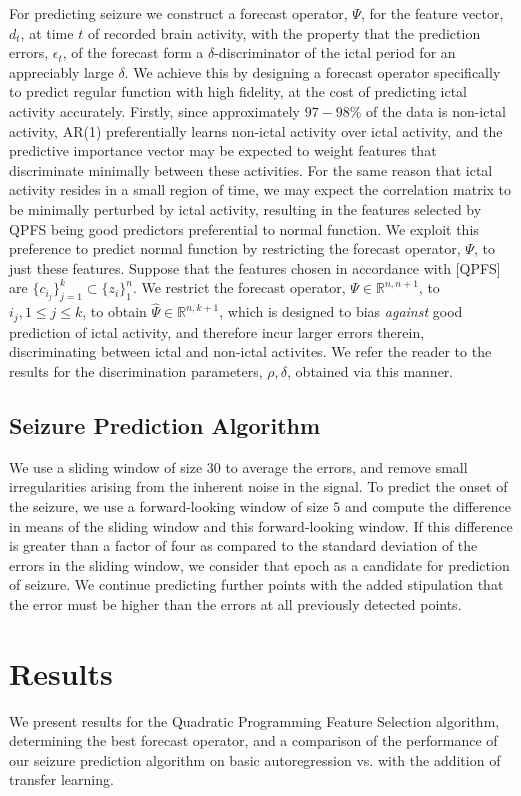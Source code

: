 \documentclass{article} %
\theoremstyle{definition}
\theoremstyle{remark}
\newcommand{\rls}[1]{\mathbb{R}^{#1}}
\newcommand{\e}{\epsilon}
\renewcommand{\e}{\epsilon}
\begin{document}
For predicting seizure we construct a forecast operator, $\Psi$, for the feature vector, $d_t$, at time $t$ of recorded brain activity, with the property that the prediction errors, $\e_t$, of the forecast form a $\delta$-discriminator of the ictal period for an appreciably large $\delta$. We achieve this by designing a forecast operator specifically to predict regular function with high fidelity, at the cost of predicting ictal activity accurately. Firstly, since approximately $97-98 \%$ of the data is non-ictal activity, AR(1) preferentially learns non-ictal activity over ictal activity, and the predictive importance vector may be expected to weight features that discriminate minimally between these activities. For the same reason that ictal activity resides in a small region of time, we may expect the correlation matrix to be minimally perturbed by ictal activity, resulting in the features selected by QPFS being good predictors preferential to normal function. We exploit this preference to predict normal function by restricting the forecast operator, $\Psi$, to just these features. Suppose that the features chosen in accordance with [QPFS] are $\{ c_{i_j} \}_{j=1} ^k \subset \{ z_i  \}_1 ^n$. We restrict the forecast operator, $\Psi \in \rls{n, n+1}$, to $i_j, 1\leq j \leq k$, to obtain $\hat{\Psi} \in \rls{n, k+1}$, which is designed to bias \emph{against} good prediction of ictal activity, and therefore incur larger errors therein, discriminating between ictal and non-ictal activites. We refer the reader to the results for the discrimination parameters, $\rho, \delta$, obtained via this manner.

\subsection{Seizure Prediction Algorithm}
We use a sliding window of size $30$ to average the errors, and remove small irregularities arising from the inherent noise in the signal.  To predict the onset of the seizure, we use a forward-looking window of size $5$ and compute the difference in means of the sliding window and this forward-looking window.  If this difference is greater than a factor of four as compared to the standard deviation of the errors in the sliding window, we consider that epoch as a candidate for prediction of seizure.  We continue predicting further points with the added stipulation that the error must be higher than the errors at all previously detected points.  

\section{Results} \label{sec:results}
We present results for the Quadratic Programming Feature Selection algorithm, determining the best forecast operator, and a comparison of the performance of our seizure prediction algorithm on basic autoregression vs. with the addition of transfer learning.
\end{document}
